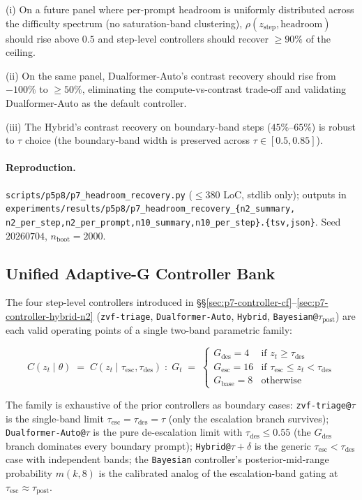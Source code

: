 (i) On a future panel where per-prompt headroom is uniformly
distributed across the difficulty spectrum (no saturation-band
clustering), $\rho(z_{\mathrm{step}}, \mathrm{headroom})$ should
rise above $0.5$ and step-level controllers should recover
$\ge 90\%$ of the ceiling.

(ii) On the same panel, Dualformer-Auto's contrast recovery should
rise from $-100\%$ to $\ge 50\%$, eliminating the compute-vs-contrast
trade-off and validating Dualformer-Auto as the default controller.

(iii) The Hybrid's contrast recovery on boundary-band steps
($45$\%--$65\%$) is robust to $\tau$ choice (the boundary-band width
is preserved across $\tau \in [0.5, 0.85]$).

\paragraph{Reproduction.}
\texttt{scripts/p5p8/p7\_headroom\_recovery.py}
($\leq 380$ LoC, stdlib only); outputs in
\texttt{experiments/results/p5p8/p7\_headroom\_recovery\_\{n2\_summary,
n2\_per\_step,n2\_per\_prompt,n10\_summary,n10\_per\_step\}.\{tsv,json\}}.
Seed $20260704$, $n_{\mathrm{boot}}{=}2000$.


\subsection{Unified Adaptive-G Controller Bank}
\label{sec:p7-controller-bank}

The four step-level controllers introduced in
\S\S\ref{sec:p7-controller-cf}--\ref{sec:p7-controller-hybrid-n2}
(\texttt{zvf-triage}, \texttt{Dualformer-Auto}, \texttt{Hybrid},
\texttt{Bayesian@$\tau_{\mathrm{post}}$}) are each valid operating
points of a single two-band parametric family:

\begin{equation}
C(z_t \mid \theta) \;=\; C(z_t \mid \tau_{\mathrm{esc}}, \tau_{\mathrm{des}}) \;:\;
G_t \;=\; \begin{cases}
G_{\mathrm{des}}=4 & \text{if } z_t \ge \tau_{\mathrm{des}} \\
G_{\mathrm{esc}}=16 & \text{if } \tau_{\mathrm{esc}} \le z_t < \tau_{\mathrm{des}} \\
G_{\mathrm{base}}=8 & \text{otherwise}
\end{cases}
\label{eq:p7-unified}
\end{equation}

The family is exhaustive of the prior controllers as boundary cases:
\texttt{zvf-triage@$\tau$} is the single-band limit
$\tau_{\mathrm{esc}}=\tau_{\mathrm{des}}=\tau$ (only the escalation
branch survives); \texttt{Dualformer-Auto@$\tau$} is the pure
de-escalation limit with $\tau_{\mathrm{des}}\le 0.55$ (the
$G_{\mathrm{des}}$ branch dominates every boundary prompt);
\texttt{Hybrid@$\tau+\delta$} is the generic $\tau_{\mathrm{esc}} < \tau_{\mathrm{des}}$
case with independent bands; the \texttt{Bayesian} controller's
posterior-mid-range probability $m(k,8)$ is the calibrated analog
of the escalation-band gating at $\tau_{\mathrm{esc}}\approx \tau_{\mathrm{post}}$.

